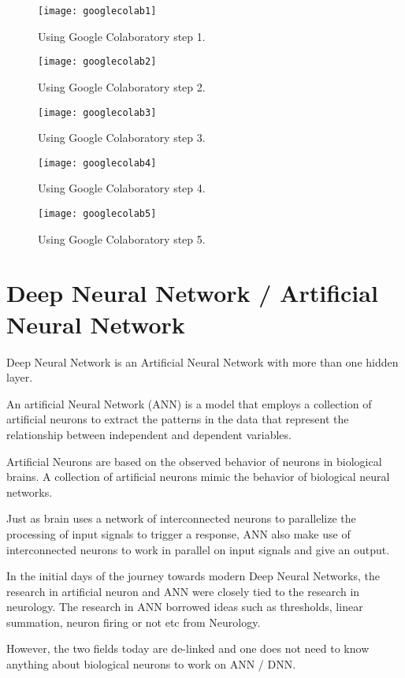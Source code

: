 	\begin{figure}[h]
		\centering
		\texttt{[image: googlecolab1]}
		\caption[Using Google Colab step 1]{Using Google Colaboratory step 1.}
		\label{fig:googlecolab1}
	\end{figure}

	\begin{figure}[h]
		\centering
		\texttt{[image: googlecolab2]}
		\caption[Using Google Colab step 2]{Using Google Colaboratory step 2.}
		\label{fig:googlecolab2}
	\end{figure}

	\begin{figure}[h]
		\centering
		\texttt{[image: googlecolab3]}
		\caption[Using Google Colab step 3]{Using Google Colaboratory step 3.}
		\label{fig:googlecolab3}
	\end{figure}

 	\begin{figure}[h]
		\centering
		\texttt{[image: googlecolab4]}
		\caption[Using Google Colab step 4]{Using Google Colaboratory step 4.}
		\label{fig:googlecolab4}
	\end{figure}
\clearpage{}

 	\begin{figure}[h]
		\centering
		\texttt{[image: googlecolab5]}
		\caption[Using Google Colab step 5]{Using Google Colaboratory step 5.}
		\label{fig:googlecolab5}
	\end{figure}


	\section{Deep Neural Network / Artificial Neural Network}

	\begin{bulletedlist}
		\item Deep Neural Network is an Artificial Neural Network with more than one hidden layer.
		\item An artificial Neural Network (ANN) is a model that employs a collection of artificial neurons to extract the patterns in the data that represent the relationship between independent and dependent variables.
		\item Artificial Neurons are based on the observed behavior of neurons in biological brains. A collection of artificial neurons mimic the behavior of biological neural networks.
		\item Just as brain uses a network of interconnected neurons to parallelize the processing of input signals to trigger a response, ANN also make use of interconnected neurons to work in parallel on input signals and give an output.
		\item In the initial days of the journey towards modern Deep Neural Networks, the research in artificial neuron and ANN were closely tied to the research in
neurology. The research in ANN borrowed ideas such as thresholds, linear summation, neuron firing or not etc from Neurology.
		\item However, the two fields today are de-linked and one does not need to know anything about biological neurons to work on ANN / DNN.
	\end{bulletedlist}

